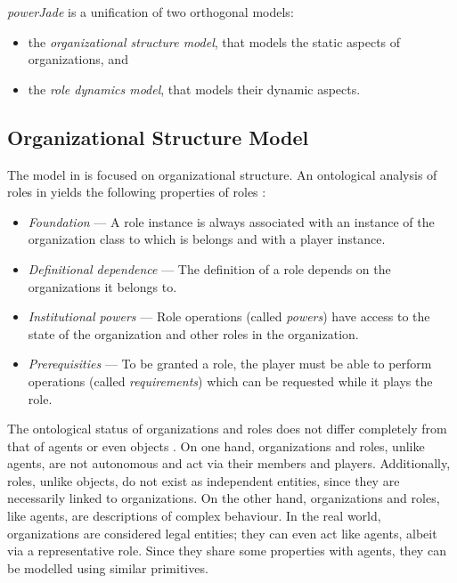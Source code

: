 \textit{powerJade} is a unification of two orthogonal models:
\begin{itemize}
	\item the \textit{organizational structure model}, that models the static aspects of organizations, and
	\item the \textit{role dynamics model}, that models their dynamic aspects.
\end{itemize}

\subsection*{Organizational Structure Model}

The model in \cite{Boella04} is focused on organizational structure.
An ontological analysis of roles in yields the following properties of roles \cite{Boella04}:
\begin{itemize}
	\item \textit{Foundation} --- A role instance is always associated with an instance of the organization class to which is belongs and with a player instance.
	\item \textit{Definitional dependence} --- The definition of a role depends on the organizations it belongs to.
	\item \textit{Institutional powers} --- Role operations (called \textit{powers}) have access to the state of the organization and other roles in the organization.
	\item \textit{Prerequisities} --- To be granted a role, the player must be able to perform operations (called \textit{requirements}) which can be requested while it plays the role.
\end{itemize}

The ontological status of organizations and roles does not differ completely from that of agents or even objects \cite{Boella04}.
On one hand, organizations and roles, unlike agents, are not autonomous and act via their members and players.
Additionally, roles, unlike objects, do not exist as independent entities, since they are necessarily linked to organizations.
On the other hand, organizations and roles, like agents, are descriptions of complex behaviour.
In the real world, organizations are considered legal entities; they can even act like agents, albeit via a representative role.
Since they share some properties with agents, they can be modelled using similar primitives.

